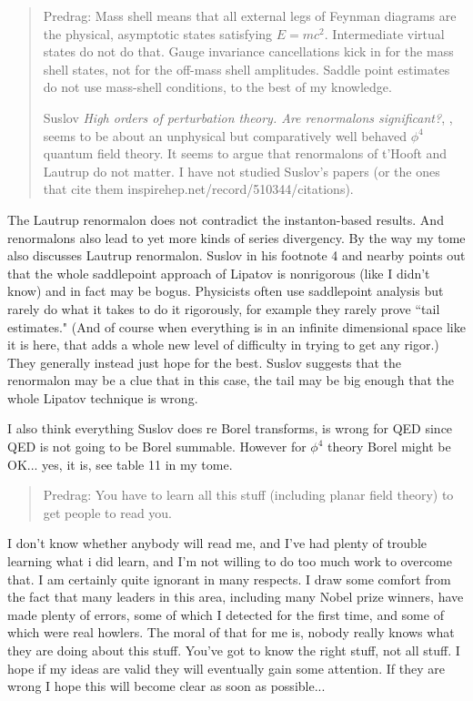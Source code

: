 \begin{description}
\begin{quote} Predrag:
Mass shell means that all external legs of Feynman diagrams are the
physical, asymptotic states satisfying $E = mc^2$. Intermediate virtual
states do not do that. Gauge invariance cancellations kick in for the
mass shell states, not for the off-mass shell amplitudes. Saddle point
estimates do not use mass-shell conditions, to the best of my knowledge.

Suslov
   {\em High orders of perturbation theory. {Are} renormalons significant?},
    ,
    seems to be about an unphysical but comparatively well behaved
$\phi^4$ quantum field theory.
It seems to argue that renormalons of t'Hooft and Lautrup do not matter. I
   have not studied Suslov's papers (or the ones that cite
   them 
   {inspirehep.net/record/510344/citations}).
\end{quote}
The Lautrup renormalon does not contradict the instanton-based results.
And renormalons also lead to yet more kinds of series divergency.
By the way my tome also discusses Lautrup renormalon.
Suslov in his footnote 4 and nearby points out that the whole
saddlepoint approach of Lipatov is nonrigorous (like I didn't know)
and in fact may be bogus.   Physicists often
use saddlepoint analysis but rarely do what it takes to do it
rigorously, for example they
rarely prove ``tail estimates."  (And of course when everything is in
an infinite dimensional space like it is here, that adds a whole new
level of difficulty in trying
to get any rigor.)  They generally instead just hope for the best.
Suslov suggests that the renormalon may be a clue that in this case, the
tail may be big enough that the whole Lipatov technique is wrong.

I also think everything Suslov does re Borel transforms, is wrong for QED since
QED is not going to be Borel summable.  However for $\phi^4$ theory
Borel might be OK... yes, it is, see table 11 in my tome.


\begin{quote} Predrag:
   You have to learn all this stuff (including
   {planar field theory}) to get people to read you.
\end{quote}

I don't know whether anybody will read me, and I've had plenty of
trouble learning what i did learn, and I'm not willing to do too much
work to overcome that.
 I am certainly quite ignorant in many respects.  I draw some comfort
from the fact that many leaders in this area, including many Nobel
prize winners, have made plenty of errors, some of which I detected
for the first time, and some of which were real howlers.   The moral
of that for me is, nobody really knows what they are doing about this
stuff.  You've got to know the right stuff, not all stuff.  I hope if
my ideas are valid they will eventually gain some attention. If they
are wrong I hope this will become clear as soon as possible...

\end{description}

\printbibliography[heading=subbibintoc,title={References}]
